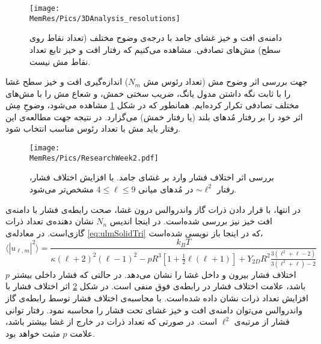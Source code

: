 \begin{figure}[htbp]
\begin{center}
\texttt{[image: \\MemRes/Pics/3DAnalysis\_resolutions]}
\caption{
دامنه‌ی افت و خیز غشای جامد با درجه‌ی وضوح مختلف (تعداد نقاط روی  سطح) مش‌های تصادفی. مشاهده می‌کنیم که رفتار افت و خیز تابع تعداد نقاط مش نیست. 
}
\label{fig:3DAnalysis_resolutions}
\end{center}
\end{figure}

جهت بررسی اثر وضوح مش (تعداد رئوس مش 
$N_m$)
 اندازه‌گیری افت و خیز سطح غشا را با ثابت نگه داشتن مدول یانگ، ضریب سختی خمش، و شعاع مش را با مش‌های مختلف تصادفی تکرار کرده‌ایم. همانطور که در شکل
\ref{fig:3DAnalysis_resolutions}
مشاهده می‌شود، وضوحِ مِش اثر خود را بر رفتار مُد‌های بلند (یا رفتار خمش)  می‌گزارد. در نتیجه جهت مطالعه‌ی این رفتار باید مش با تعداد رئوس مناسب انتخاب شود. 

\begin{figure}[htbp]
\begin{center}
\texttt{[image: \\MemRes/Pics/ResearchWeek2.pdf]}
\caption{
بررسی اثر اختلاف فشار وارد بر غشای جامد. با افزایش اختلاف فشار، رفتار 
$\sim\ell^2$
در مُد‌های میانی 
$4\leq\ell\leq9$
مشخص‌تر می‌شود.
}
\label{fig:presure}
\end{center}
\end{figure}

در انتها، با قرار دادن ذرات گاز واندروالس درون غشا، صحت رابطه‌ی فشار با دامنه‌ی افت خیز نیز بررسی شده‌است. در اینجا اندیس 
$N_n$
نشان دهنده‌ی تعداد ذرات گازی‌است. در معادله‌ی 
\ref{eq:ulmSolidTri}
که در اینجا باز نویسی شده‌است،
\begin{equation}
\langle|u_{\ell,m}|^2\rangle=\frac{k_BT}{\kappa(\ell+2)^2(\ell-1)^2-pR^3\left[1+\frac{1}{2}\ell(\ell+1)\right]+Y_{2D}R^2\frac{3(\ell^2+\ell-2)}{3(\ell^2+\ell)-2}}
\end{equation}
$p$
اختلاف فشار بیرون و داخل غشا را نشان می‌دهد. در حالتی که فشار داخلی بیشتر باشد، علامت اختلاف فشار در رابطه‌ی فوق منفی‌ است. در شکل 
\ref{fig:presure}
اثر اختلاف فشار با افزایش تعداد ذرات نشان دا‌ده‌ شده‌است. با محاسبه‌ی اختلاف فشار توسط رابطه‌ی گاز واندروالس می‌توان دامنه‌ی افت و خیز غشای تحت فشار را محاسبه نمود. رفتار توانی فشار از مرتبه‌ی 
$\ell^2$
است. در صورتی که تعداد ذرات در خارج از غشا بیشتر باشد، علامت 
$p$
مثبت خواهد بود.





